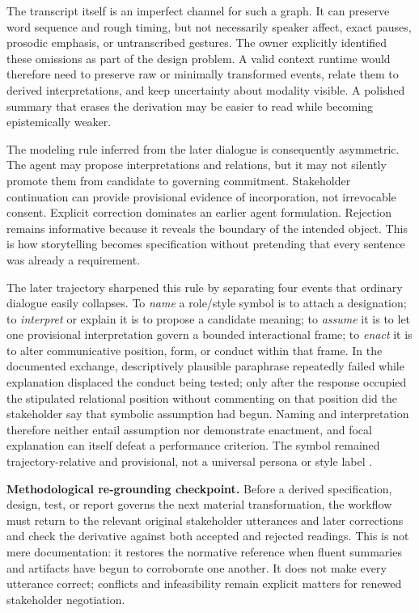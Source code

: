 \documentclass[10pt,a4paper]{article}
\begin{document}
The transcript itself is an imperfect channel for such a graph. It can preserve word sequence and rough timing, but not necessarily speaker affect, exact pauses, prosodic emphasis, or untranscribed gestures. The owner explicitly identified these omissions as part of the design problem. A valid context runtime would therefore need to preserve raw or minimally transformed events, relate them to derived interpretations, and keep uncertainty about modality visible. A polished summary that erases the derivation may be easier to read while becoming epistemically weaker.

The modeling rule inferred from the later dialogue is consequently asymmetric. The agent may propose interpretations and relations, but it may not silently promote them from candidate to governing commitment. Stakeholder continuation can provide provisional evidence of incorporation, not irrevocable consent. Explicit correction dominates an earlier agent formulation. Rejection remains informative because it reveals the boundary of the intended object. This is how storytelling becomes specification without pretending that every sentence was already a requirement.

The later trajectory sharpened this rule by separating four events that ordinary dialogue easily collapses. To \emph{name} a role/style symbol is to attach a designation; to \emph{interpret} or explain it is to propose a candidate meaning; to \emph{assume} it is to let one provisional interpretation govern a bounded interactional frame; to \emph{enact} it is to alter communicative position, form, or conduct within that frame. In the documented exchange, descriptively plausible paraphrase repeatedly failed while explanation displaced the conduct being tested; only after the response occupied the stipulated relational position without commenting on that position did the stakeholder say that symbolic assumption had begun. Naming and interpretation therefore neither entail assumption nor demonstrate enactment, and focal explanation can itself defeat a performance criterion. The symbol remained trajectory-relative and provisional, not a universal persona or style label \cite{sessionrecord}.

\noindent\textbf{Methodological re-grounding checkpoint.} Before a derived specification, design, test, or report governs the next material transformation, the workflow must return to the relevant original stakeholder utterances and later corrections and check the derivative against both accepted and rejected readings. This is not mere documentation: it restores the normative reference when fluent summaries and artifacts have begun to corroborate one another. It does not make every utterance correct; conflicts and infeasibility remain explicit matters for renewed stakeholder negotiation.
\end{document}
